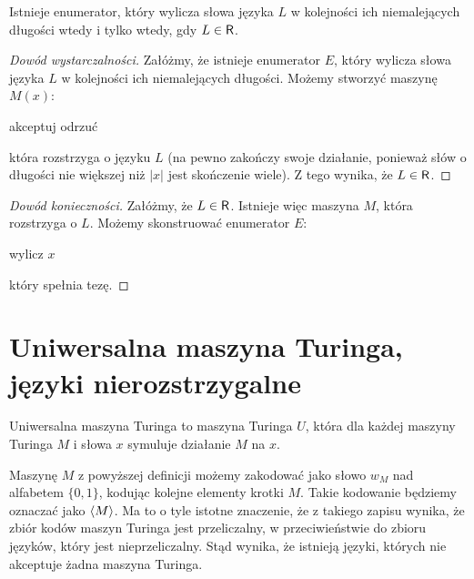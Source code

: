 \begin{theorem}\label{t:non-decreasing enumerator iff R}
    Istnieje enumerator, który wylicza słowa języka $L$ w kolejności ich niemalejących długości wtedy i tylko wtedy, gdy $L \in \textsf{R}$.
\end{theorem}
\begin{proof}[Dowód wystarczalności]
    Załóżmy, że istnieje enumerator $E$, który wylicza słowa języka $L$ w kolejności ich niemalejących długości. Możemy stworzyć maszynę $M(x)$:
    \begin{algorithmic}
                \State akceptuj
            \EndIf
                \State odrzuć
            \EndIf
        \EndFor
    \end{algorithmic}
    która rozstrzyga o języku $L$ (na pewno zakończy swoje działanie, ponieważ słów o długości nie większej niż $|x|$ jest skończenie wiele). Z tego wynika, że $L \in \textsf{R}$.
\end{proof}
\begin{proof}[Dowód konieczności]
    Załóżmy, że $L \in \textsf{R}$. Istnieje więc maszyna $M$, która rozstrzyga o $L$. Możemy skonstruować enumerator $E$:
    \begin{algorithmic}
                    \State wylicz $x$
                \EndIf
            \EndFor
        \EndFor
    \end{algorithmic}
    który spełnia tezę.
\end{proof}

\section{Uniwersalna maszyna Turinga, języki nierozstrzygalne}

\begin{definition}
    Uniwersalna maszyna Turinga to maszyna Turinga $U$, która dla każdej maszyny Turinga $M$ i słowa $x$ symuluje działanie $M$ na $x$.
\end{definition}

Maszynę $M$ z powyższej definicji możemy zakodować jako słowo $w_M$ nad alfabetem $\{0, 1\}$, kodując kolejne elementy krotki $M$. Takie kodowanie będziemy oznaczać jako $\left\langle M \right\rangle$. Ma to o tyle istotne znaczenie, że z takiego zapisu wynika, że zbiór kodów maszyn Turinga jest przeliczalny, w przeciwieństwie do zbioru języków, który jest nieprzeliczalny. Stąd wynika, że istnieją języki, których nie akceptuje żadna maszyna Turinga.

